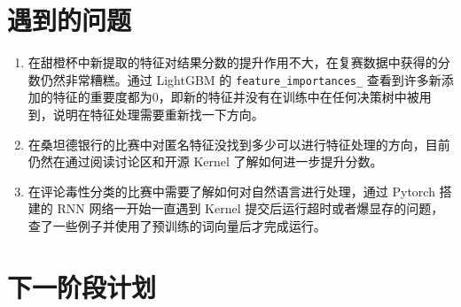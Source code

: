 \documentclass[12pt]{article}
\begin{document}
\section{遇到的问题}
\begin{enumerate}
    \item 在甜橙杯中新提取的特征对结果分数的提升作用不大，在复赛数据中获得的分数仍然非常糟糕。通过 LightGBM 的 \lstinline{feature_importances_} 查看到许多新添加的特征的重要度都为0，即新的特征并没有在训练中在任何决策树中被用到，说明在特征处理需要重新找一下方向。
    \item 在桑坦德银行的比赛中对匿名特征没找到多少可以进行特征处理的方向，目前仍然在通过阅读讨论区和开源 Kernel 了解如何进一步提升分数。
    \item 在评论毒性分类的比赛中需要了解如何对自然语言进行处理，通过 Pytorch 搭建的 RNN 网络一开始一直遇到 Kernel 提交后运行超时或者爆显存的问题，查了一些例子并使用了预训练的词向量后才完成运行。
\end{enumerate}


\section{下一阶段计划}
\end{document}
